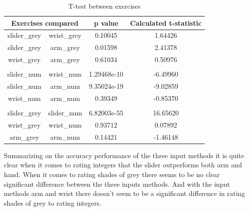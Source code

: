 \begin{table}[]
\centering
\begin{tabular}{cccc}
\multicolumn{2}{c}{Exercises compared} & p value & Calculated t-statistic \\ \hline
\multicolumn{1}{|c|}{slider\_grey} & \multicolumn{1}{c|}{wrist\_grey} & \multicolumn{1}{c|}{0.10045} & \multicolumn{1}{c|}{1.64426} \\ \hline
\multicolumn{1}{|c|}{slider\_grey} & \multicolumn{1}{c|}{arm\_grey} & \multicolumn{1}{c|}{0.01598} & \multicolumn{1}{c|}{2.41378} \\ \hline
\multicolumn{1}{|c|}{wrist\_grey} & \multicolumn{1}{c|}{arm\_grey} & \multicolumn{1}{c|}{0.61034} & \multicolumn{1}{c|}{0.50976} \\ \hline
\multicolumn{1}{l}{} & \multicolumn{1}{l}{} & \multicolumn{1}{l}{} & \multicolumn{1}{l}{} \\ \hline
\multicolumn{1}{|c|}{slider\_num} & \multicolumn{1}{c|}{wrist\_num} & \multicolumn{1}{c|}{1.29468e-10} & \multicolumn{1}{c|}{-6.49960} \\ \hline
\multicolumn{1}{|c|}{slider\_num} & \multicolumn{1}{c|}{arm\_num} & \multicolumn{1}{c|}{9.35024e-19} & \multicolumn{1}{c|}{-9.02859} \\ \hline
\multicolumn{1}{|c|}{wrist\_num} & \multicolumn{1}{c|}{arm\_num} & \multicolumn{1}{c|}{0.39349} & \multicolumn{1}{c|}{-0.85370} \\ \hline
\multicolumn{1}{l}{} & \multicolumn{1}{l}{} & \multicolumn{1}{l}{} & \multicolumn{1}{l}{} \\ \hline
\multicolumn{1}{|c|}{slider\_grey} & \multicolumn{1}{c|}{slider\_num} & \multicolumn{1}{c|}{6.82003e-55} & \multicolumn{1}{c|}{16.65620} \\ \hline
\multicolumn{1}{|c|}{wrist\_grey} & \multicolumn{1}{c|}{wrist\_num} & \multicolumn{1}{c|}{0.93712} & \multicolumn{1}{c|}{0.07892} \\ \hline
\multicolumn{1}{|c|}{arm\_grey} & \multicolumn{1}{c|}{arm\_num} & \multicolumn{1}{c|}{0.14421} & \multicolumn{1}{c|}{-1.46148} \\ \hline
\end{tabular}
\caption{T-test between exercises}
\label{ttest}
\end{table}

Summarizing on the accuracy performance of the three input methods it is quite clear when it comes to rating integers that the slider outperforms both arm and hand. When it comes to rating shades of grey there seems to be no clear significant difference between the three inputs methods. And with the input methods arm and wrist there doesn't seem to be a significant difference in rating shades of grey to rating integers.

